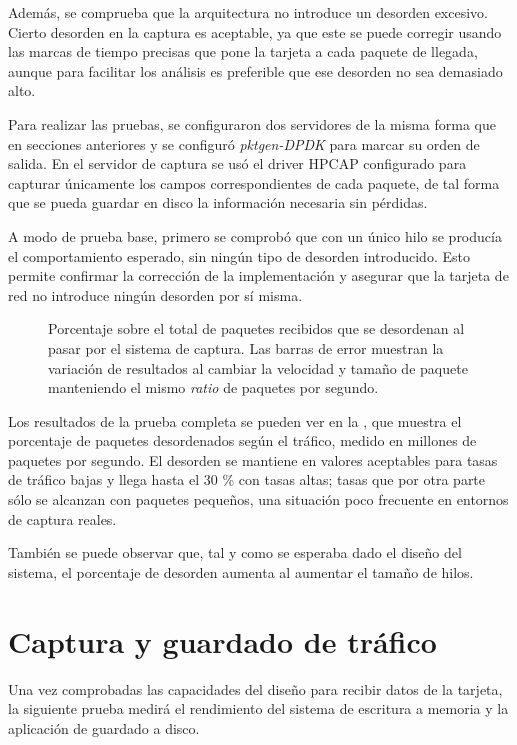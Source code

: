 \documentclass[oneside, draft]{epstfg}
\begin{document}
Además, se comprueba que la arquitectura no introduce un desorden excesivo. Cierto desorden en la captura es aceptable, ya que este se puede corregir usando las marcas de tiempo precisas que pone la tarjeta a cada paquete de llegada, aunque para facilitar los análisis es preferible que ese desorden no sea demasiado alto.

Para realizar las pruebas, se configuraron dos servidores de la misma forma que en secciones anteriores y se configuró \textit{pktgen-DPDK} para marcar su orden de salida. En el servidor de captura se usó el driver HPCAP configurado para capturar únicamente los campos correspondientes de cada paquete, de tal forma que se pueda guardar en disco la información necesaria sin pérdidas.

A modo de prueba base, primero se comprobó que con un único hilo se producía el comportamiento esperado, sin ningún tipo de desorden introducido. Esto permite confirmar la corrección de la implementación y asegurar que la tarjeta de red no introduce ningún desorden por sí misma.

\begin{figure}[hbtp]
\caption[Desorden de paquetes inducido por el sistema de captura]{Porcentaje sobre el total de paquetes recibidos que se desordenan al pasar por el sistema de captura. Las barras de error muestran la variación de resultados al cambiar la velocidad y tamaño de paquete manteniendo el mismo \textit{ratio} de paquetes por segundo.}
\label{fig:Validacion:Ordering}
\end{figure}

Los resultados de la prueba completa se pueden ver en la , que muestra el porcentaje de paquetes desordenados según el tráfico, medido en millones de paquetes por segundo. El desorden se mantiene en valores aceptables para tasas de tráfico bajas y llega hasta el 30 \% con tasas altas; tasas que por otra parte sólo se alcanzan con paquetes pequeños, una situación poco frecuente en entornos de captura reales.

También se puede observar que, tal y como se esperaba dado el diseño del sistema, el porcentaje de desorden aumenta al aumentar el tamaño de hilos.

\section{Captura y guardado de tráfico}

Una vez comprobadas las capacidades del diseño para recibir datos de la tarjeta, la siguiente prueba medirá el rendimiento del sistema de escritura a memoria y la aplicación de guardado a disco.
\end{document}
